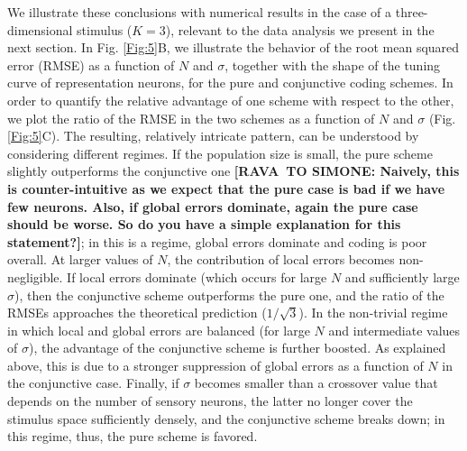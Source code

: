 \documentclass[a4paper]{article}%
\begin{document}
We illustrate these conclusions with numerical results in the case of a
three-dimensional stimulus ($K=3$), relevant to the data analysis we present
in the next section. In Fig. \ref{Fig:5}B, we illustrate the behavior of the
root mean squared error (RMSE) as a function of $N$ and $\sigma$, together
with the shape of the tuning curve of representation neurons, for the pure and
conjunctive coding schemes. In order to quantify the relative advantage of one
scheme with respect to the other, we plot the ratio of the RMSE in the two
schemes as a function of $N$ and $\sigma$ (Fig. \ref{Fig:5}C). The resulting,
relatively intricate pattern, can be understood by considering different
regimes. If the population size is small, the pure scheme slightly outperforms
the conjunctive one \textbf{[RAVA\ TO SIMONE: Naively, this is
counter-intuitive as we expect that the pure case is bad if we have few
neurons. Also, if global errors dominate, again the pure case should be worse.
So do you have a simple explanation for this statement?]}; in this is a
regime, global errors dominate and coding is poor overall. At larger values of
$N$, the contribution of local errors becomes non-negligible. If local errors
dominate (which occurs for large $N$ and sufficiently large $\sigma$), then
the conjunctive scheme outperforms the pure one, and the ratio of the RMSEs
approaches the theoretical prediction ($1/\sqrt{3}$). In the non-trivial
regime in which local and global errors are balanced (for large $N$ and
intermediate values of $\sigma$), the advantage of the conjunctive scheme is
further boosted. As explained above, this is due to a stronger suppression of
global errors as a function of $N$ in the conjunctive case. Finally, if
$\sigma$ becomes smaller than a crossover value that depends on the number of
sensory neurons, the latter no longer cover the stimulus space sufficiently
densely, and the conjunctive scheme breaks down; in this regime, thus, the
pure scheme is favored.
\end{document}

